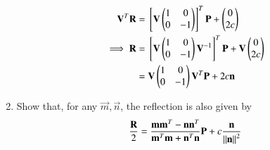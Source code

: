 \begin{enumerate}[label=\arabic*.,ref=\thesubsection.\theenumi]
\begin{align}
\label{eq:reflect_}
\mathbf{V}^T\mathbf{R} &=  {}\left[\mathbf{V}\begin{pmatrix}1 & 0 \\ 0 & -1\end{pmatrix}\right]^T\mathbf{P}+\begin{pmatrix}0 \\ 2c\end{pmatrix}
\\
\implies \mathbf{R} &= {}\left[\mathbf{V}\begin{pmatrix}1 & 0 \\ 0 & -1\end{pmatrix}\mathbf{V}^{-1}\right]^T\mathbf{P}+ \mathbf{V}\begin{pmatrix}0 \\ 2c\end{pmatrix}
\\
 &=\mathbf{V}\begin{pmatrix}1 & 0 \\ 0 & -1\end{pmatrix}\mathbf{V}^T \mathbf{P}+2c \mathbf{n}
\end{align}
\item Show that, for any $\vec{m},\vec{n}$, the reflection is also given by
\begin{align}
\frac{\mathbf{R}}{2} = \frac{\mathbf{m}\mathbf{m}^T-\mathbf{n}\mathbf{n}^T}{\mathbf{m}^T\mathbf{m}+\mathbf{n}^T\mathbf{n}}\mathbf{P} + c 
\frac{\mathbf{n}}{\left\lVert\mathbf{n}\right\rVert^2}
\end{align}

\end{enumerate}
%
%
